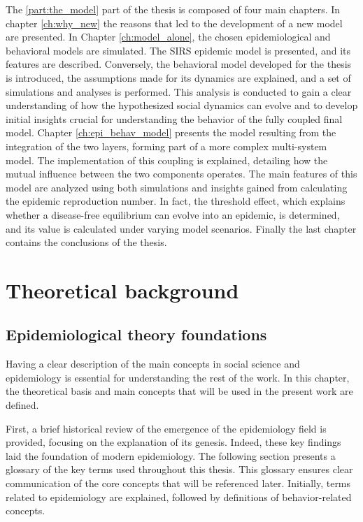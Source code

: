 The \ref{part:the_model} part of the thesis is composed of four main chapters. In chapter \ref{ch:why_new} the reasons that led to the development of a new model are presented.
In Chapter \ref{ch:model_alone}, the chosen epidemiological and behavioral models are simulated. The SIRS epidemic model is presented, and its features are described. Conversely, the behavioral model developed for the thesis is introduced, the assumptions made for its dynamics are explained, and a set of simulations and analyses is performed. This analysis is conducted to gain a clear understanding of how the hypothesized social dynamics can evolve and to develop initial insights crucial for understanding the behavior of the fully coupled final model.
Chapter \ref{ch:epi_behav_model} presents the model resulting from the integration of the two layers, forming part of a more complex multi-system model. The implementation of this coupling is explained, detailing how the mutual influence between the two components operates. The main features of this model are analyzed using both simulations and insights gained from calculating the epidemic reproduction number. In fact, the threshold effect, which explains whether a disease-free equilibrium can evolve into an epidemic, is determined, and its value is calculated under varying model scenarios.
Finally the last chapter contains the conclusions of the thesis. 
\chapter{Theoretical background}
\label{ch:theo_back}
\section{Epidemiological theory foundations}

Having a clear description of the main concepts in social science and epidemiology is essential for understanding the rest of the work. In this chapter, the theoretical basis and main concepts that will be used in the present work are defined. 

First, a brief historical review of the emergence of the epidemiology field is provided, focusing on the explanation of its genesis. Indeed, these key findings laid the foundation of modern  epidemiology. 
The following section presents a glossary of the key terms used throughout this thesis. This glossary ensures clear communication of the core concepts that will be referenced later. Initially, terms related to epidemiology are explained, followed by definitions of behavior-related concepts.

